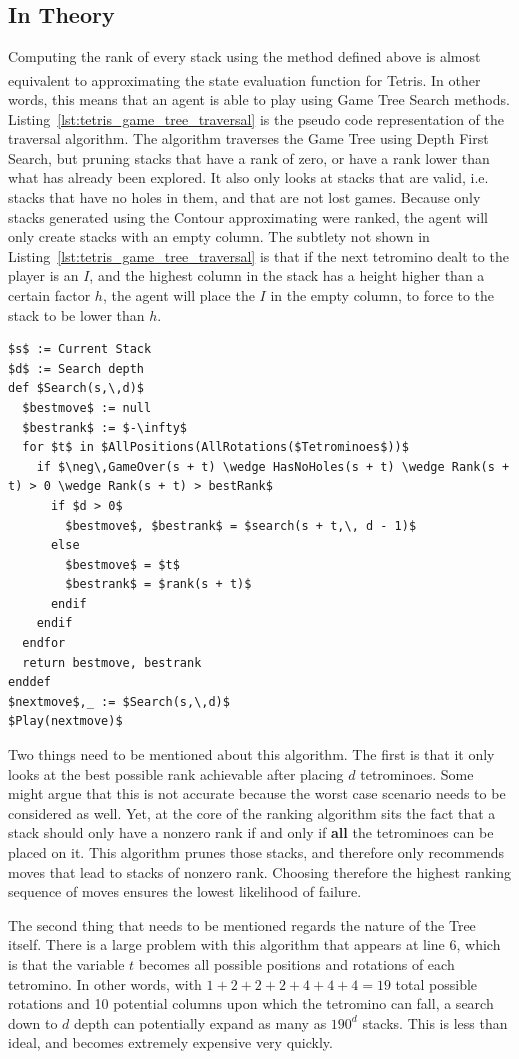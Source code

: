 \documentclass[fontsize=12pt]{article}
\def\tetris{Tetris\textsuperscript{\textregistered}}
\begin{document}
\subsection{In Theory}
\label{sub:in_theory}
\par Computing the rank of every stack using the method defined above is almost equivalent to approximating the state evaluation function for \tetris{}. In other words, this means that an agent is able to play using Game Tree Search methods. Listing~\ref{lst:tetris_game_tree_traversal} is the pseudo code representation of the traversal algorithm. The algorithm traverses the Game Tree using Depth First Search, but pruning stacks that have a rank of zero, or have a rank lower than what has already been explored. It also only looks at stacks that are valid, i.e. stacks that have no holes in them, and that are not lost games. Because only stacks generated using the Contour approximating were ranked, the agent will only create stacks with an empty column. The subtlety not shown in Listing~\ref{lst:tetris_game_tree_traversal} is that if the next tetromino dealt to the player is an $I$, and the highest column in the stack has a height higher than a certain factor $h$, the agent will place the $I$ in the empty column, to force to the stack to be lower than $h$.
\begin{lstlisting}[caption={\tetris{} Game Tree Traversal},label={lst:tetris_game_tree_traversal}, style=Pseudocode]
$s$ := Current Stack
$d$ := Search depth
def $Search(s,\,d)$
  $bestmove$ := null
  $bestrank$ := $-\infty$
  for $t$ in $AllPositions(AllRotations($Tetrominoes$))$
    if $\neg\,GameOver(s + t) \wedge HasNoHoles(s + t) \wedge Rank(s + t) > 0 \wedge Rank(s + t) > bestRank$
      if $d > 0$
        $bestmove$, $bestrank$ = $search(s + t,\, d - 1)$
      else
        $bestmove$ = $t$
        $bestrank$ = $rank(s + t)$
      endif
    endif
  endfor
  return bestmove, bestrank
enddef
$nextmove$,_ := $Search(s,\,d)$
$Play(nextmove)$
\end{lstlisting}
\par Two things need to be mentioned about this algorithm. The first is that it only looks at the best possible rank achievable after placing $d$ tetrominoes. Some might argue that this is not accurate because the worst case scenario needs to be considered as well. Yet, at the core of the ranking algorithm sits the fact that a stack should only have a nonzero rank if and only if \textbf{all} the tetrominoes can be placed on it. This algorithm prunes those stacks, and therefore only recommends moves that lead to stacks of nonzero rank. Choosing therefore the highest ranking sequence of moves ensures the lowest likelihood of failure.
\par The second thing that needs to be mentioned regards the nature of the Tree itself. There is a large problem with this algorithm that appears at line 6, which is that the variable $t$ becomes all possible positions and rotations of each tetromino. In other words, with $1 + 2 + 2 + 2 + 4 + 4 + 4 = 19$ total possible rotations and 10 potential columns upon which the tetromino can fall, a search down to $d$ depth can potentially expand as many as $190^d$ stacks. This is less than ideal, and becomes extremely expensive very quickly.
\end{document}
